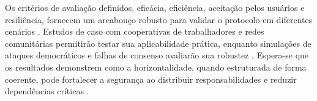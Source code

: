 Os critérios de avaliação definidos, eficácia, eficiência, aceitação pelos
usuários e resiliência, fornecem um arcabouço robusto para validar o protocolo em
diferentes cenários \cite{RiskCentricThreatModeling}. Estudos de caso
com cooperativas de trabalhadores e redes comunitárias permitirão
testar sua aplicabilidade prática, enquanto simulações
de ataques democráticos e falhas de consenso avaliarão sua robustez \cite{EverydayRevolutions}.
Espera-se que os resultados demonstrem como a horizontalidade, quando estruturada de forma
coerente, pode fortalecer a segurança ao distribuir responsabilidades e reduzir
dependências críticas \cite{Colbac, EverydayRevolutions}.